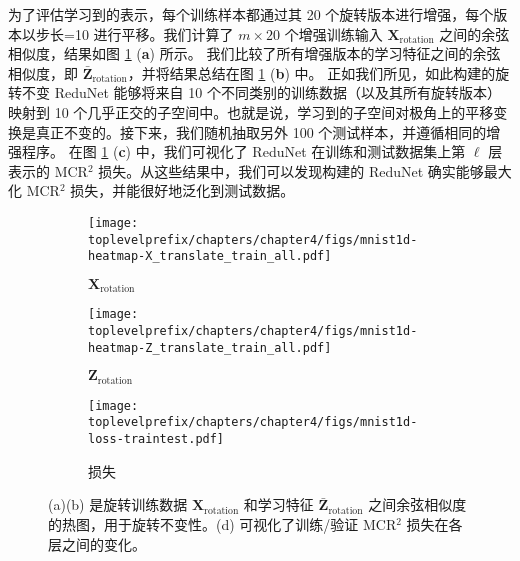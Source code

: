 \documentclass[../../book-main_zh.tex]{subfiles}
\begin{document}
\begin{example}[数字的不变分类]
为了评估学习到的表示，每个训练样本都通过其 20 个旋转版本进行增强，每个版本以步长=10 进行平移。我们计算了 $m \times 20$ 个增强训练输入 $\bm{X}_{\text{rotation}}$ 之间的余弦相似度，结果如图 \ref{fig:redu-invariant-1d-mnist-diagram} (\textbf{a}) 所示。
我们比较了所有增强版本的学习特征之间的余弦相似度，即 $\bar{\bm{Z}}_{\text{rotation}}$，并将结果总结在图 \ref{fig:redu-invariant-1d-mnist-diagram} (\textbf{b}) 中。
正如我们所见，如此构建的旋转不变 ReduNet 能够将来自 10 个不同类别的训练数据（以及其所有旋转版本）映射到 10 个几乎正交的子空间中。也就是说，学习到的子空间对极角上的平移变换是真正不变的。接下来，我们随机抽取另外 100 个测试样本，并遵循相同的增强程序。
在图 \ref{fig:redu-invariant-1d-mnist-diagram} (\textbf{c}) 中，我们可视化了 ReduNet 在训练和测试数据集上第 $\ell$ 层表示的 MCR$^{2}$ 损失。从这些结果中，我们可以发现构建的 ReduNet 确实能够最大化 MCR$^{2}$ 损失，并能很好地泛化到测试数据。



\begin{figure}[t]
    \begin{subfigure}[t]{0.3\textwidth}
        \centering
        \texttt{[image: \\toplevelprefix/chapters/chapter4/figs/mnist1d-heatmap-X\_translate\_train\_all.pdf]}
        \caption{$\bm{X}_{\text{rotation}}$}
    \end{subfigure}
    \hfill
    \begin{subfigure}[t]{0.3\textwidth}
        \centering
        \texttt{[image: \\toplevelprefix/chapters/chapter4/figs/mnist1d-heatmap-Z\_translate\_train\_all.pdf]}
        \caption{$\bm{Z}_{\text{rotation}}$}
    \end{subfigure}
    \hfill
    \begin{subfigure}[t]{0.32\textwidth}
        \centering
        \texttt{[image: \\toplevelprefix/chapters/chapter4/figs/mnist1d-loss-traintest.pdf]}
        \caption{损失}
    \end{subfigure}
    \caption{\small (a)(b) 是旋转训练数据 $\bm{X}_{\text{rotation}}$ 和学习特征 $\bar{\bm{Z}}_{\text{rotation}}$ 之间余弦相似度的热图，用于旋转不变性。(d) 可视化了训练/验证 MCR$^2$ 损失在各层之间的变化。}
    \label{fig:redu-invariant-1d-mnist-diagram}
\end{figure}

\end{example}
\end{document}
